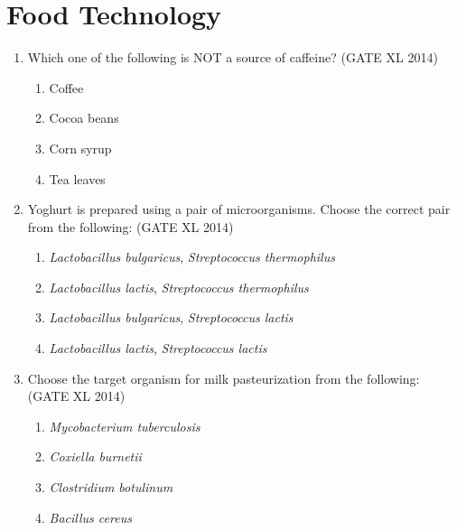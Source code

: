 \documentclass[journal,12pt,onecolumn]{IEEEtran}
\theoremstyle{remark}
\begin{document}
\section*{Food Technology}
\begin{enumerate}
    \item Which one of the following is NOT a source of caffeine?  
    \hfill (GATE XL 2014)
    \begin{multicols}{2}
    \begin{enumerate}
        \item Coffee  
        \item Cocoa beans  
        \item Corn syrup  
        \item Tea leaves  
    \end{enumerate}
    \end{multicols}
    

    \item Yoghurt is prepared using a pair of microorganisms. Choose the correct pair from the following:  
    \hfill (GATE XL 2014)
    \begin{multicols}{2}
    \begin{enumerate}
        \item \textit{Lactobacillus bulgaricus}, \textit{Streptococcus thermophilus}  
        \item \textit{Lactobacillus lactis}, \textit{Streptococcus thermophilus}  
        \item \textit{Lactobacillus bulgaricus}, \textit{Streptococcus lactis}  
        \item \textit{Lactobacillus lactis}, \textit{Streptococcus lactis}  
    \end{enumerate}
    \end{multicols}
    

    \item Choose the target organism for milk pasteurization from the following:  
    \hfill (GATE XL 2014)
    \begin{multicols}{2}
    \begin{enumerate}
        \item \textit{Mycobacterium tuberculosis}  
        \item \textit{Coxiella burnetii}  
        \item \textit{Clostridium botulinum}  
        \item \textit{Bacillus cereus}  
    \end{enumerate}
    \end{multicols}
    


\end{enumerate}
\end{document}
